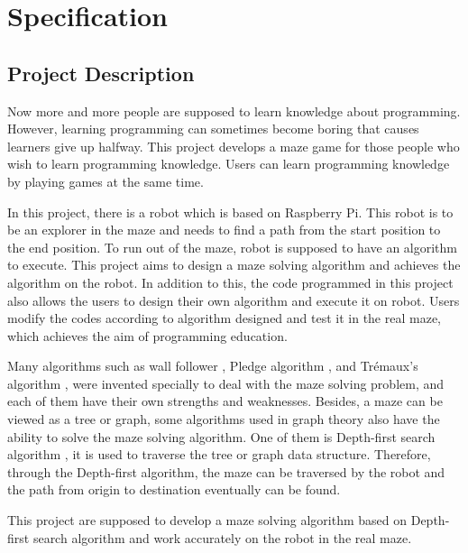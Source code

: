 \documentclass[11pt,times,oneside,openright,hardcopy]{eeereport}
\begin{document}

\mainmatter
{}

\chapter{Specification}\label{cpt:spec}

\section{Project Description}
Now more and more people are supposed to learn knowledge about programming. However, learning programming can sometimes become boring that causes learners give up halfway.
This project develops a maze game for those people who wish to learn programming knowledge. Users can learn programming knowledge by playing games at the same time.

In this project, there is a robot which is based on Raspberry Pi. This robot is to be an explorer in the maze and needs to find a path from the start position to the end position.
To run out of the maze, robot is supposed to have an algorithm to execute. This project aims to design a maze solving algorithm and achieves the algorithm on the robot.
In addition to this, the code programmed in this project also allows the users to design their own algorithm and execute it on robot. Users modify the codes according to algorithm designed and test it in the real maze, which achieves the aim of programming education.

Many algorithms such as wall follower \cite{BullenIV:2009vv}, Pledge algorithm \cite{Klein:2011hi}, and Trémaux's algorithm \cite{Anonymous:2007ch}, were invented specially to deal with the maze solving problem, and each of them have their own strengths and weaknesses.
Besides, a maze can be viewed as a tree or graph, some algorithms used in graph theory also have the ability to solve the maze solving algorithm. One of them is Depth-first search algorithm \cite{Braendeland:2015wf}, it is used to traverse the tree or graph data structure. Therefore, through the Depth-first algorithm, the maze can be traversed by the robot and the path from origin to destination eventually can be found.

This project are supposed to develop a maze solving algorithm based on Depth-first search algorithm and work accurately on the robot in the real maze.
\end{document}
